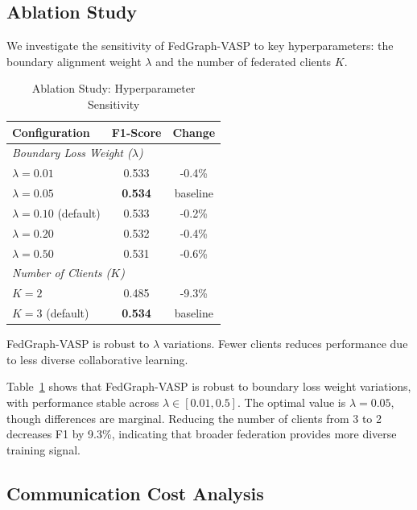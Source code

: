 \documentclass[conference]{IEEEtran}
\begin{document}
\subsection{Ablation Study}

We investigate the sensitivity of FedGraph-VASP to key hyperparameters: the boundary alignment weight $\lambda$ and the number of federated clients $K$.

\begin{table}[htbp]
\caption{Ablation Study: Hyperparameter Sensitivity}
\begin{center}
\begin{tabular}{lcc}
\toprule
\textbf{Configuration} & \textbf{F1-Score} & \textbf{Change} \\
\midrule
\multicolumn{3}{l}{\textit{Boundary Loss Weight ($\lambda$)}} \\
$\lambda = 0.01$ & 0.533 & -0.4\% \\
$\lambda = 0.05$ & \textbf{0.534} & baseline \\
$\lambda = 0.10$ (default) & 0.533 & -0.2\% \\
$\lambda = 0.20$ & 0.532 & -0.4\% \\
$\lambda = 0.50$ & 0.531 & -0.6\% \\
\midrule
\multicolumn{3}{l}{\textit{Number of Clients ($K$)}} \\
$K = 2$ & 0.485 & -9.3\% \\
$K = 3$ (default) & \textbf{0.534} & baseline \\
\bottomrule
\end{tabular}
\label{tab:ablation}
\end{center}
\vspace{-0.2cm}
\footnotesize{FedGraph-VASP is robust to $\lambda$ variations. Fewer clients reduces performance due to less diverse collaborative learning.}
\end{table}

Table~\ref{tab:ablation} shows that FedGraph-VASP is robust to boundary loss weight variations, with performance stable across $\lambda \in [0.01, 0.5]$. The optimal value is $\lambda = 0.05$, though differences are marginal. Reducing the number of clients from 3 to 2 decreases F1 by 9.3\%, indicating that broader federation provides more diverse training signal.

\subsection{Communication Cost Analysis}
\end{document}
